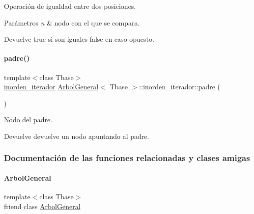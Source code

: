 Operación de igualdad entre dos posiciones. 


\begin{DoxyParams}{Parámetros}
{\em n} & nodo con el que se compara. \\
\hline
\end{DoxyParams}
\begin{DoxyReturn}{Devuelve}
true si son iguales false en caso opuesto. 
\end{DoxyReturn}
\hypertarget{classArbolGeneral_1_1inorden__iterador_ae4b1e23e86b54e03288398f7dca60cea}{}\label{classArbolGeneral_1_1inorden__iterador_ae4b1e23e86b54e03288398f7dca60cea} 
\paragraph{\texorpdfstring{padre()}{padre()}}
{\footnotesize\ttfamily template$<$class Tbase$>$ \\
\hyperlink{classArbolGeneral_1_1inorden__iterador}{inorden\+\_\+iterador} \hyperlink{classArbolGeneral}{Arbol\+General}$<$ Tbase $>$\+::inorden\+\_\+iterador\+::padre (\begin{DoxyParamCaption}{ }\end{DoxyParamCaption})\hspace{0.3cm}{\ttfamily [inline]}}



Nodo del padre. 

\begin{DoxyReturn}{Devuelve}
devuelve un nodo apuntando al padre. 
\end{DoxyReturn}


\subsubsection{Documentación de las funciones relacionadas y clases amigas}
\hypertarget{classArbolGeneral_1_1inorden__iterador_a9c06e31b7c3e0d4ee5b03003d32935a5}{}\label{classArbolGeneral_1_1inorden__iterador_a9c06e31b7c3e0d4ee5b03003d32935a5} 
\paragraph{\texorpdfstring{Arbol\+General}{ArbolGeneral}}
{\footnotesize\ttfamily template$<$class Tbase$>$ \\
friend class \hyperlink{classArbolGeneral}{Arbol\+General}\hspace{0.3cm}{\ttfamily [friend]}}



